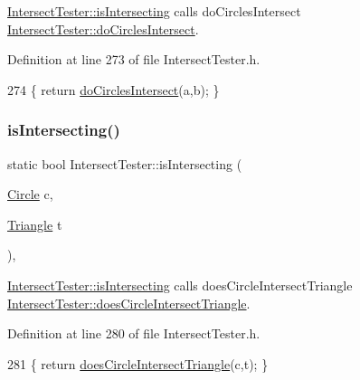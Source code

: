 \hyperlink{class_intersect_tester_a7710e17ff7d2e229059f23b9429213f5}{Intersect\+Tester\+::is\+Intersecting} calls do\+Circles\+Intersect  \hyperlink{class_intersect_tester_a5ce26d69bdb46983fb96516c8a8e1b55}{Intersect\+Tester\+::do\+Circles\+Intersect}. 



Definition at line 273 of file Intersect\+Tester.\+h.


\begin{DoxyCode}
274     \{ \textcolor{keywordflow}{return} \hyperlink{class_intersect_tester_a5ce26d69bdb46983fb96516c8a8e1b55}{doCirclesIntersect}(a,b); \}
\end{DoxyCode}
\mbox{\label{class_intersect_tester_a76f351cdf60b75daf6a4a1e7240c1f3d}} 
\subsubsection{\texorpdfstring{is\+Intersecting()}{isIntersecting()}\hspace{0.1cm}{\footnotesize\ttfamily [11/15]}}
{\footnotesize\ttfamily static bool Intersect\+Tester\+::is\+Intersecting (\begin{DoxyParamCaption}\item[{\hyperlink{class_circle}{Circle}}]{c,  }\item[{\hyperlink{class_triangle}{Triangle}}]{t }\end{DoxyParamCaption})\hspace{0.3cm}{\ttfamily [inline]}, {\ttfamily [static]}}



\hyperlink{class_intersect_tester_a7710e17ff7d2e229059f23b9429213f5}{Intersect\+Tester\+::is\+Intersecting} calls does\+Circle\+Intersect\+Triangle  \hyperlink{class_intersect_tester_a4a2f8f6f66be1f1d432c3e04e919273f}{Intersect\+Tester\+::does\+Circle\+Intersect\+Triangle}. 



Definition at line 280 of file Intersect\+Tester.\+h.


\begin{DoxyCode}
281     \{ \textcolor{keywordflow}{return} \hyperlink{class_intersect_tester_a4a2f8f6f66be1f1d432c3e04e919273f}{doesCircleIntersectTriangle}(c,t); \}
\end{DoxyCode}
\mbox{\label{class_intersect_tester_afe557ee5f9e2da763c430cbbad44162e}} 
